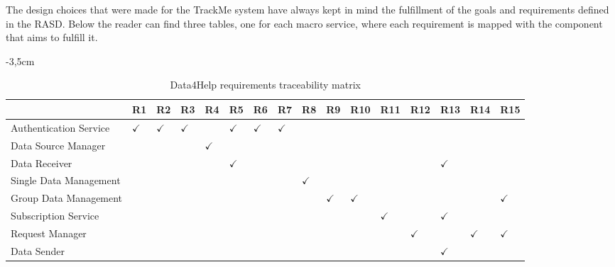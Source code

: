 The design choices that were made for the TrackMe system have always kept in mind the fulfillment of the goals and requirements defined in the RASD. Below the reader can find three tables, one for each macro service, where each requirement is mapped with the component that aims to fulfill it.

\begin{table}
\begin{adjustwidth}{-3,5cm}{}
\captionsetup{justification=centering}
\caption{Data4Help requirements traceability matrix}
  \label{tab:table1}
\begin{tabular}{|l||l|l|l|l|l|l|l|l|l|l|l|l|l|l|l|}
\hline
\cellcolor[HTML]{EFEFEF}                      &\cellcolor[HTML]{EFEFEF}R1 & \cellcolor[HTML]{EFEFEF}R2 & \cellcolor[HTML]{EFEFEF}R3 & \cellcolor[HTML]{EFEFEF}R4 & \cellcolor[HTML]{EFEFEF}R5 & \cellcolor[HTML]{EFEFEF}R6 & \cellcolor[HTML]{EFEFEF}R7 & \cellcolor[HTML]{EFEFEF}R8 & \cellcolor[HTML]{EFEFEF}R9 &\cellcolor[HTML]{EFEFEF}R10 & \cellcolor[HTML]{EFEFEF}R11 & \cellcolor[HTML]{EFEFEF}R12 & \cellcolor[HTML]{EFEFEF}R13 & \cellcolor[HTML]{EFEFEF}R14 & \cellcolor[HTML]{EFEFEF}R15\\ \hline \hline
\cellcolor[HTML]{EFEFEF}Authentication Service & $\checkmark$  & $\checkmark$  & $\checkmark$  &    & $\checkmark$  & $\checkmark$  & $\checkmark$  &    &    &     &     &     &     &     & \\ \hline
\cellcolor[HTML]{EFEFEF}Data Source Manager     &    &    &    & $\checkmark$  &    &    &    &    &    &     &     &     &     &     & \\ \hline
\cellcolor[HTML]{EFEFEF}Data Receiver         &    &    &    &    & $\checkmark$  &    &    &    &    &     &     &     & $\checkmark$   &     & \\ \hline
\cellcolor[HTML]{EFEFEF}Single Data Management    &    &    &    &    &    &    &    & $\checkmark$  &    &     &     &     &     &     & \\ \hline
\cellcolor[HTML]{EFEFEF}Group Data Management  &    &    &    &    &    &    &    &    & $\checkmark$  & $\checkmark$   &     &     &     &     & $\checkmark$ \\ \hline
\cellcolor[HTML]{EFEFEF}Subscription Service  &    &    &    &    &    &    &    &    &    &     & $\checkmark$   &     & $\checkmark$   &     & \\ \hline
\cellcolor[HTML]{EFEFEF}Request Manager       &    &    &    &    &    &    &    &    &    &     &     & $\checkmark$   &     & $\checkmark$   & $\checkmark$ \\ \hline
\cellcolor[HTML]{EFEFEF}Data Sender           &    &    &    &    &    &    &    &    &    &     &     &     & $\checkmark$   &     & \\ \hline
\end{tabular}
\end{adjustwidth}
\end{table}


